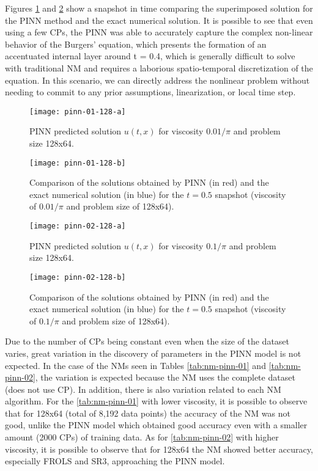 Figures \ref{fig:pinn-01-128-b} and \ref{fig:pinn-02-128-b} show a snapshot in time comparing the superimposed solution for the PINN method and the exact numerical solution.
It is possible to see that even using a few CPs, the PINN was able to accurately capture the complex non-linear behavior of the Burgers' equation, which presents the formation of an accentuated internal layer around t = 0.4, which is generally difficult to solve with traditional NM and requires a laborious spatio-temporal discretization of the equation. 
In this scenario, we can directly address the nonlinear problem without needing to commit to any prior assumptions, linearization, or local time step.

\begin{figure}[htb]\begin{minipage}[b]{\textwidth}\centering
\texttt{[image: pinn-01-128-a]}
\vspace{-1em}
\caption{PINN predicted solution $u(t, x)$ for viscosity ${0.01}/{\pi}$ and problem size 128x64.}
\label{fig:pinn-01-128-a}
\texttt{[image: pinn-01-128-b]}
\vspace{-1em}
\caption{Comparison of the solutions obtained by PINN (in red) and the exact numerical solution (in blue) for the $t=0.5$ snapshot (viscosity of ${0.01}/{\pi}$ and problem size of 128x64).}
\label{fig:pinn-01-128-b}
\end{minipage}\end{figure}

\begin{figure}[htb]\begin{minipage}[b]{\textwidth}\centering
\texttt{[image: pinn-02-128-a]}
\vspace{-1em}
\caption{PINN predicted solution $u(t, x)$ for viscosity ${0.1}/{\pi}$ and problem size 128x64.}
\label{fig:pinn-02-128-a}
\texttt{[image: pinn-02-128-b]}
\vspace{-1em}
\caption{Comparison of the solutions obtained by PINN (in red) and the exact numerical solution (in blue) for the $t=0.5$ snapshot (viscosity of ${0.1}/{\pi}$ and problem size of 128x64).}
\label{fig:pinn-02-128-b}
\end{minipage}\end{figure}

Due to the number of CPs being constant even when the size of the dataset varies, great variation in the discovery of parameters in the PINN model is not expected. In the case of the NMs seen in Tables \ref{tab:nm-pinn-01} and \ref {tab:nm-pinn-02}, the variation is expected because the NM uses the complete dataset (does not use CP). In addition, there is also variation related to each NM algorithm. For the \autoref{tab:nm-pinn-01} with lower viscosity, it is possible to observe that for 128x64 (total of 8,192 data points) the accuracy of the NM was not good, unlike the PINN model which obtained good accuracy even with a smaller amount (2000 CPs) of training data. As for \autoref{tab:nm-pinn-02} with higher viscosity, it is possible to observe that for 128x64 the NM showed better accuracy, especially FROLS and SR3, approaching the PINN model.

